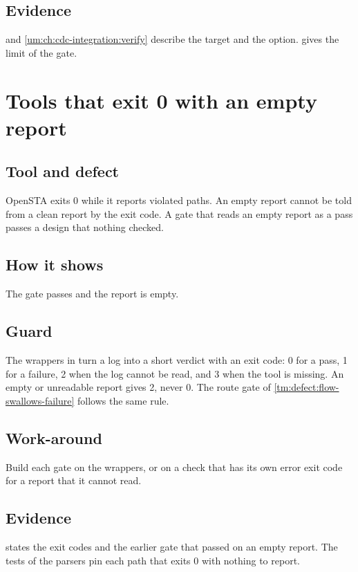 \subsection*{Evidence}
 and \cref{um:ch:cdc-integration:verify} describe the target and the option.  gives the limit of the gate.

\section{Tools that exit 0 with an empty report}\label{tm:defect:empty-report-passes}
\subsection*{Tool and defect}
OpenSTA exits 0 while it reports violated paths. An empty report cannot be told from a clean report by the exit code. A gate that reads an empty report as a pass passes a design that nothing checked.

\subsection*{How it shows}
The gate passes and the report is empty.

\subsection*{Guard}
The wrappers in  turn a log into a short verdict with an exit code: 0 for a pass, 1 for a failure, 2 when the log cannot be read, and 3 when the tool is missing. An empty or unreadable report gives 2, never 0. The route gate of \cref{tm:defect:flow-swallows-failure} follows the same rule.

\subsection*{Work-around}
Build each gate on the wrappers, or on a check that has its own error exit code for a report that it cannot read.

\subsection*{Evidence}
 states the exit codes and the earlier gate that passed on an empty report. The tests of the parsers pin each path that exits 0 with nothing to report.


